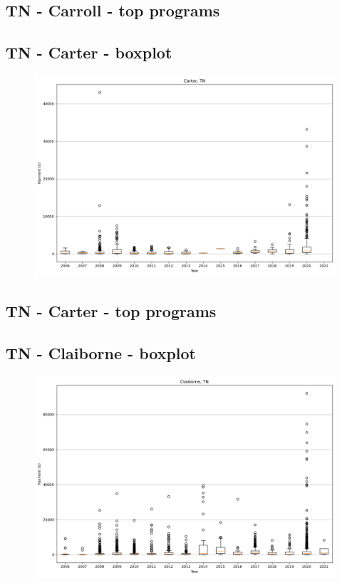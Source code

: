 \subsection*{TN - Carroll - top programs}

\newpage
\subsection*{TN - Carter - boxplot}
\begin{figure}[h]
\centering
\includegraphics[width=7in]{../output/boxplots/counties/Carter-TN_boxplot.png}
\end{figure}


\subsection*{TN - Carter - top programs}

\newpage
\subsection*{TN - Claiborne - boxplot}
\begin{figure}[h]
\centering
\includegraphics[width=7in]{../output/boxplots/counties/Claiborne-TN_boxplot.png}
\end{figure}


